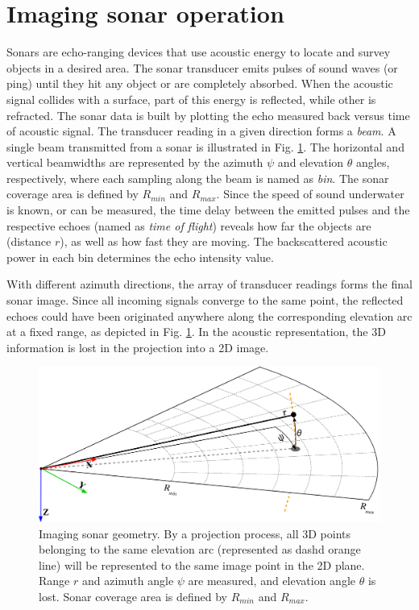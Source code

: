 \documentclass[final,5p,times]{elsarticle}
\begin{document}
\section{Imaging sonar operation}
\label{sonar:operation}

Sonars are echo-ranging devices that use acoustic energy to locate and survey
objects in a desired area. The sonar transducer emits pulses of sound waves
(or ping) until they hit any object or are completely absorbed. When the
acoustic signal collides with a surface, part of this energy is reflected,
while other is refracted. The sonar data is built by plotting the echo measured back versus time of acoustic signal. The transducer reading in a given direction forms a \textit{beam}. A single beam transmitted from a sonar is illustrated in Fig. \ref{fig:sonar_geometry}. The horizontal and vertical beamwidths are represented by the azimuth $\psi$ and elevation $\theta$ angles, respectively, where each sampling along the beam is named as \textit{bin}. The sonar coverage area is defined by $R_{min}$ and $R_{max}$. Since the speed of sound underwater is known, or can be measured, the time delay between the emitted pulses and the respective echoes (named as \textit{time of flight}) reveals how far the objects are (distance $r$), as well as how fast they are moving. The backscattered acoustic power in each bin determines the echo intensity value.

With different azimuth directions, the array of transducer readings forms the
final sonar image. Since all incoming signals converge to the same point, the
reflected echoes could have been originated anywhere along the corresponding
elevation arc at a fixed range, as depicted in Fig. \ref{fig:sonar_geometry}.
In the acoustic representation, the 3D information is lost in the projection
into a 2D image.


\begin{figure}[t]
    \includegraphics[width=\columnwidth]{figs/sonar_geometry_2}
    \captionsetup{justification=justified}
    \caption{Imaging sonar geometry. By a projection process, all 3D points  belonging to the same elevation arc (represented as dashd orange line) will be represented to the same image point in the 2D plane. Range $r$ and azimuth angle $\psi$ are measured, and elevation angle $\theta$ is lost. Sonar coverage area is defined by $R_{min}$ and $R_{max}$.}
    \label{fig:sonar_geometry}
\end{figure}
\end{document}
